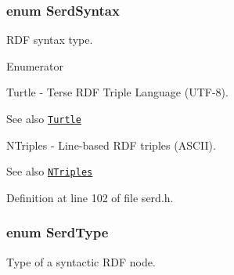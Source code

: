 \subsubsection[{\texorpdfstring{Serd\+Syntax}{SerdSyntax}}]{\setlength{\rightskip}{0pt plus 5cm}enum {\bf Serd\+Syntax}}\hypertarget{group__serd_ga42683406fcfa9046b28dd951cefd3391}{}\label{group__serd_ga42683406fcfa9046b28dd951cefd3391}
R\+DF syntax type. \begin{Desc}
\item[Enumerator]\par
\begin{description}
\item[{\em 
S\+E\+R\+D\+\_\+\+T\+U\+R\+T\+LE\hypertarget{group__serd_gga42683406fcfa9046b28dd951cefd3391a4acfee57d17213dcb55e94c55a4fd78e}{}\label{group__serd_gga42683406fcfa9046b28dd951cefd3391a4acfee57d17213dcb55e94c55a4fd78e}
}]Turtle -\/ Terse R\+DF Triple Language (U\+T\+F-\/8). \begin{DoxySeeAlso}{See also}
\href{http://www.w3.org/TeamSubmission/turtle/}{\tt Turtle} 
\end{DoxySeeAlso}
\item[{\em 
S\+E\+R\+D\+\_\+\+N\+T\+R\+I\+P\+L\+ES\hypertarget{group__serd_gga42683406fcfa9046b28dd951cefd3391a3debf79a887908f0502c20029cd050a0}{}\label{group__serd_gga42683406fcfa9046b28dd951cefd3391a3debf79a887908f0502c20029cd050a0}
}]N\+Triples -\/ Line-\/based R\+DF triples (A\+S\+C\+II). \begin{DoxySeeAlso}{See also}
\href{http://www.w3.org/TR/rdf-testcases#ntriples}{\tt N\+Triples} 
\end{DoxySeeAlso}
\end{description}
\end{Desc}


Definition at line 102 of file serd.\+h.

\subsubsection[{\texorpdfstring{Serd\+Type}{SerdType}}]{\setlength{\rightskip}{0pt plus 5cm}enum {\bf Serd\+Type}}\hypertarget{group__serd_ga7ccd8d4fb2c3a6ad690ed6d6fe1b45fa}{}\label{group__serd_ga7ccd8d4fb2c3a6ad690ed6d6fe1b45fa}
Type of a syntactic R\+DF node.


